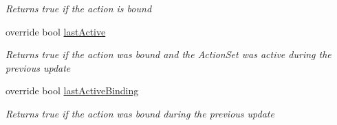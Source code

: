 \begin{DoxyCompactItemize}
\begin{DoxyCompactList}\small\item\em Returns true if the action is bound \end{DoxyCompactList}\item 
override bool \mbox{\hyperlink{class_valve_1_1_v_r_1_1_steam_v_r___action___single___source_a440bc873993ecf1c76706916bc480527}{last\+Active}}
\begin{DoxyCompactList}\small\item\em Returns true if the action was bound and the Action\+Set was active during the previous update \end{DoxyCompactList}\item 
override bool \mbox{\hyperlink{class_valve_1_1_v_r_1_1_steam_v_r___action___single___source_a81560dba183aa6a6b4df61a0e3f09663}{last\+Active\+Binding}}
\begin{DoxyCompactList}\small\item\em Returns true if the action was bound during the previous update \end{DoxyCompactList}\end{DoxyCompactItemize}
